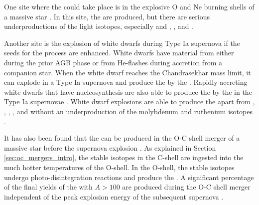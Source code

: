 One site where the \gprn{} could take place is in the explosive O and Ne burning shells of a massive star \citep{woosleyPprocessesSupernovae1978,rayetPprocessRevisited1990,rauscherNucleosynthesisMassiveStars2002}.
In this site, the \pnucn{} are produced, but there are serious underproductions of the light isotopes, especially \molybdenum[92,94] and \ruthenium[96,96], \lanthanum[138], and \tantalum[180m] \citep{rappSensitivityPProcessNucleosynthesis2006,rauscherConstrainingAstrophysicalOrigin2013,pignatariProductionProtonrichIsotopes2016}.

Another site is the explosion of white dwarfs during Type Ia supernova if the seeds for the process are enhanced.
White dwarfs have \spr{} material from either during the prior AGB phase or from He-flashes during accretion from a companion star.
When the white dwarf reaches the Chandrasekhar mass limit, it can explode in a Type Ia supernova and produce the \pnucn{} by the \gprn{} \citep{travaglioTypeIaSupernovae2011, travaglioTestingRoleSNe2015}.
Rapidly accreting white dwarfs that have \ipr{} nucleosynthesis are also able to produce the \pnucn{} by the \gprn{} in the Type Ia supernovae \citep{battinoHeavyElementsNucleosynthesis2020}.
White dwarf explosions are able to produce the \pnucn{} apart from \indium[113], \tin[115], \lanthanum[138], \gadolinium[152], and \tantalum[180m] without an underproduction of the molybdenum and ruthenium isotopes \citep{rauscherConstrainingAstrophysicalOrigin2013}.

It has also been found that the \pnucn{} can be produced in the O-C shell merger of a massive star before the supernova explosion \citep{rauscherNucleosynthesisMassiveStars2002,ritterConvectivereactiveNucleosynthesisSc2018,robertiGprocessNucleosynthesisCorecollapse2023}.
As explained in Section \ref{sec:oc_mergers_intro}, the stable isotopes in the C-shell are ingested into the much hotter temperatures of the O-shell.
In the O-shell, the stable isotopes undergo photo-disintegration reactions and produce the \pnucn{}.
A significant percentage of the final yields of the \pnucn{} with $A>100$ are produced during the O-C shell merger independent of the peak explosion energy of the subsequent supernova \citep{robertiGprocessNucleosynthesisCorecollapse2023, robertiGprocessNucleosynthesisCorecollapse2024b}.